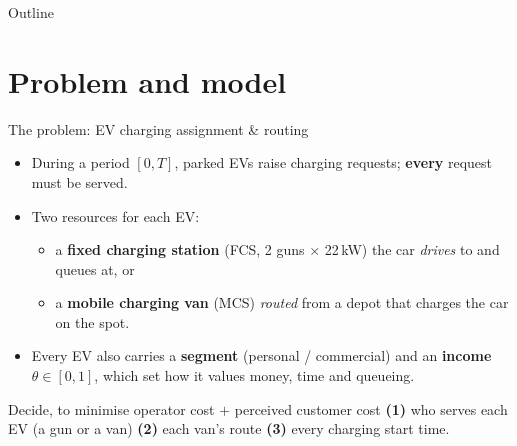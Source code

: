 \documentclass[aspectratio=169,11pt]{beamer}
\begin{document}

\begin{frame}{Outline}
  \tableofcontents
\end{frame}

\section{Problem and model}

\begin{frame}{The problem: EV charging assignment \& routing}
  \begin{itemize}
    \item During a period $[0,T]$, parked EVs raise charging requests; \textbf{every} request must be served.
    \item Two resources for each EV:
      \begin{itemize}
        \item a \textbf{fixed charging station} (FCS, 2 guns $\times$ 22\,kW) the car \emph{drives} to and queues at, or
        \item a \textbf{mobile charging van} (MCS) \emph{routed} from a depot that charges the car on the spot.
      \end{itemize}
    \item Every EV also carries a \textbf{segment} (personal / commercial) and an \textbf{income} $\theta\in[0,1]$, which set how it values money, time and queueing.
  \end{itemize}
  \vspace{0.3em}
  \begin{block}{Decide, to minimise operator cost $+$ perceived customer cost}
    \textbf{(1)} who serves each EV (a gun or a van)\quad\textbullet\quad
    \textbf{(2)} each van's route\quad\textbullet\quad
    \textbf{(3)} every charging start time.
  \end{block}
\end{frame}
\end{document}

